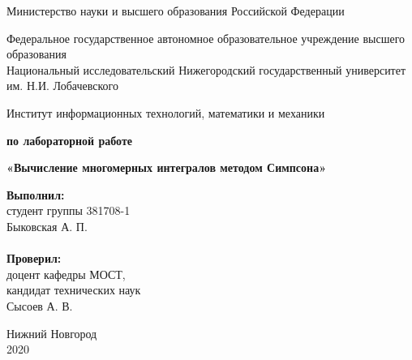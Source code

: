 \documentclass{report}
\begin{document}
\begin{titlepage}

\begin{center}
Министерство науки и высшего образования Российской Федерации
\end{center}

\begin{center}
Федеральное государственное автономное образовательное учреждение высшего образования \\
Национальный исследовательский Нижегородский государственный университет им. Н.И. Лобачевского
\end{center}

\begin{center}
Институт информационных технологий, математики и механики
\end{center}

\vspace{4em}

\begin{center}
\textbf{ по лабораторной работе} \\
\end{center}
\begin{center}
\textbf{\Large«Вычисление многомерных интегралов методом Симпсона»} \\
\end{center}

\vspace{4em}

\newbox{\lbox}
\newlength{\maxl}
\setlength{\maxl}{\wd\lbox}
\hfill\parbox{7cm}{
\hspace*{5cm}\hspace*{-5cm}\textbf{Выполнил:} \\ студент группы 381708-1 \\ Быковская А. П.\\
\\
\hspace*{5cm}\hspace*{-5cm}\textbf{Проверил:}\\ доцент кафедры МОСТ, \\ кандидат технических наук \\ Сысоев А. В.
}

\vspace{\fill}

\begin{center} Нижний Новгород \\ 2020 \end{center}

\end{titlepage}
\end{document}
